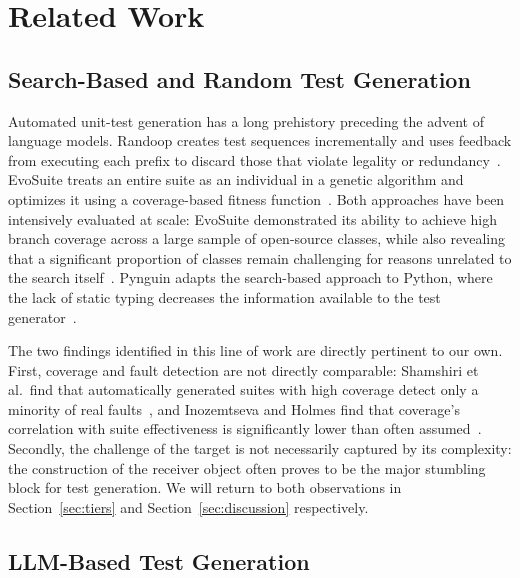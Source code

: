 \section{Related Work}\label{sec:related}

\subsection{Search-Based and Random Test Generation}

Automated unit-test generation has a long prehistory preceding the advent of language models.
Randoop creates test sequences incrementally and uses feedback from executing each prefix to
discard those that violate legality or redundancy~\cite{pacheco2007randoop}. EvoSuite treats
an entire suite as an individual in a genetic algorithm and optimizes it using a
coverage-based fitness function~\cite{fraser2011evosuite}. Both approaches have been
intensively evaluated at scale: EvoSuite demonstrated its ability to achieve high branch
coverage across a large sample of open-source classes, while also revealing that a
significant proportion of classes remain challenging for reasons unrelated to the search
itself~\cite{fraser2014largescale}. Pynguin adapts the search-based approach to Python, where
the lack of static typing decreases the information available to the test
generator~\cite{lukasczyk2022pynguin,lukasczyk2023empirical}.

The two findings identified in this line of work are directly pertinent to our own. First,
coverage and fault detection are not directly comparable: Shamshiri et al.\ find that
automatically generated suites with high coverage detect only a minority of real
faults~\cite{shamshiri2015realfaults}, and Inozemtseva and Holmes find that coverage's
correlation with suite effectiveness is significantly lower than often
assumed~\cite{inozemtseva2014coverage}. Secondly, the challenge of the target is not
necessarily captured by its complexity: the construction of the receiver object often proves
to be the major stumbling block for test generation. We will return to both observations in
Section~\ref{sec:tiers} and Section~\ref{sec:discussion} respectively.

\subsection{LLM-Based Test Generation}

